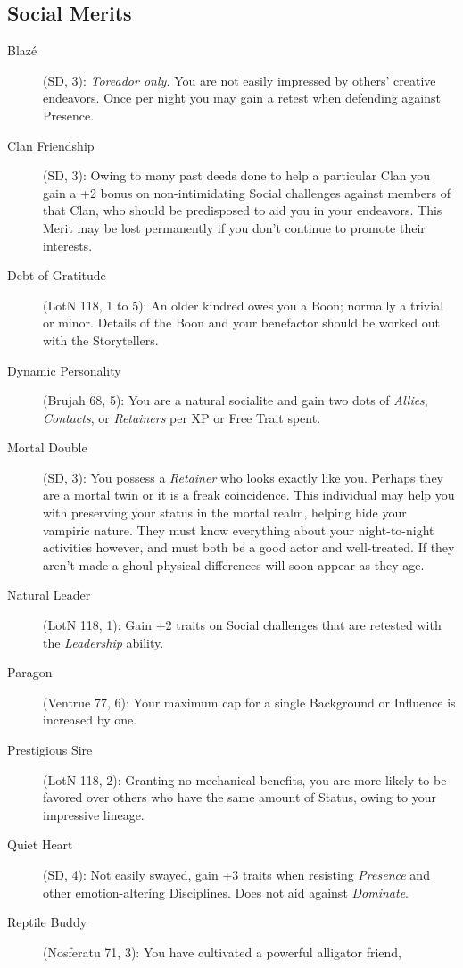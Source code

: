 \subsection{Social Merits}
\begin{description}
	\item[Blaz\'{e}] (SD, 3):  \emph{Toreador only.}  You are not easily impressed by others' creative 
	endeavors.  Once per night you may gain a retest when defending against Presence.
	\item[Clan Friendship] (SD, 3):  Owing to many past deeds done to help a particular Clan you 
	gain a +2 bonus on non-intimidating Social challenges against members of that Clan, who should be 
	predisposed to aid you in your endeavors.  This Merit may be lost permanently if you don't 
	continue to promote their interests.
	\item[Debt of Gratitude] (LotN 118, 1 to 5):  An older kindred owes you a Boon; normally a trivial or 
	minor.  Details of the Boon and your benefactor should be worked out with the Storytellers.
	\item[Dynamic Personality] (Brujah 68, 5):  You are a natural socialite and gain two dots of 
	\emph{Allies}, \emph{Contacts}, or \emph{Retainers} per XP or Free Trait spent.
	\item[Mortal Double] (SD, 3):  You possess a \emph{Retainer} who looks exactly like you.  Perhaps 
	they are a mortal twin or it is a freak coincidence.  This individual may help you with preserving 
	your status in the mortal realm, helping hide your vampiric nature.  They must know everything about 
	your night-to-night activities however, and must both be a good actor and well-treated.  If they 
	aren't made a ghoul physical differences will soon appear as they age.
	\item[Natural Leader] (LotN 118, 1):  Gain +2 traits on Social challenges that are retested with the 
	\emph{Leadership} ability.
	\item[Paragon] (Ventrue 77, 6):  Your maximum cap for a single Background or Influence is 
	increased by one.
	\item[Prestigious Sire] (LotN 118, 2):  Granting no mechanical benefits, you are more likely 
	to be favored over others who have the same amount of Status, owing to your impressive lineage.
	\item[Quiet Heart] (SD, 4):  Not easily swayed, gain +3 traits when resisting 
	\emph{Presence} and other emotion-altering Disciplines.  Does not aid against \emph{Dominate}.
	\item[Reptile Buddy] (Nosferatu 71, 3):  You have cultivated a powerful alligator friend, 

\end{description}
